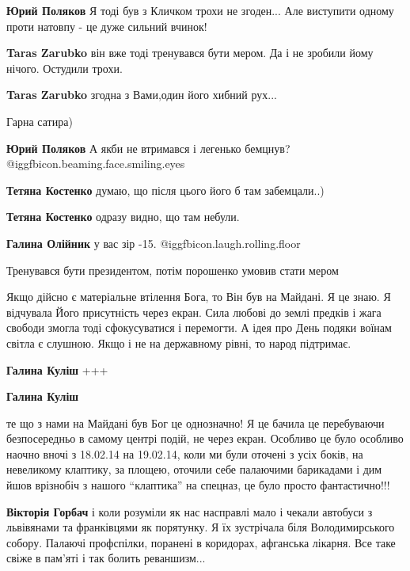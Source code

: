 \begin{itemize}
\textbf{Юрий Поляков} Я тоді був з Кличком трохи не згоден... Але виступити одному проти натовпу - це дуже сильний вчинок!

\textbf{Taras Zarubko} він вже тоді тренувався бути мером. Да і не зробили йому нічого. Остудили трохи.

\textbf{Taras Zarubko} згодна з Вами,один його хибний рух...

Гарна сатира)

\textbf{Юрий Поляков} А якби не втримався і легенько бемцнув?  @igg{fbicon.beaming.face.smiling.eyes} 

\textbf{Тетяна Костенко} думаю, що після цього його б там забемцали..)

\textbf{Тетяна Костенко} одразу видно, що там небули.

\textbf{Галина Олійник} у вас зір -15.  @igg{fbicon.laugh.rolling.floor} 

Тренувався бути президентом, потім порошенко умовив стати мером


Якщо дійсно є матеріальне втілення Бога, то Він був на Майдані. Я це знаю. Я
відчувала Його присутність через екран. Сила любові до землі предків і жага
свободи змогла тоді сфокусуватися і перемогти. А ідея про День подяки воїнам
світла є слушною. Якщо і не на державному рівні, то народ підтримає.

\begin{itemize} %
\textbf{Галина Куліш} +++


\textbf{Галина Куліш} 

те що з нами на Майдані був Бог це однозначно! Я це бачила це перебуваючи
безпосередньо в самому центрі подій, не через екран. Особливо це було особливо
наочно вночі з 18.02.14 на 19.02.14, коли ми були оточені з усіх боків, на
невеликому клаптику, за площею, оточили себе палаючими барикадами і дим йшов
врізнобіч з нашого \enquote{клаптика} на спецназ, це було просто фантастично!!!

\begin{itemize} %
\textbf{Вікторія Горбач} і коли розуміли як нас насправлі мало і чекали автобуси з львівянами та франківцями як порятунку. Я їх зустрічала біля Володимирського собору. Палаючі профспілки, поранені в коридорах, афганська лікарня. Все таке свіже в пам'яті і так болить реваншизм...
\end{itemize} %


\end{itemize}
\end{itemize}
